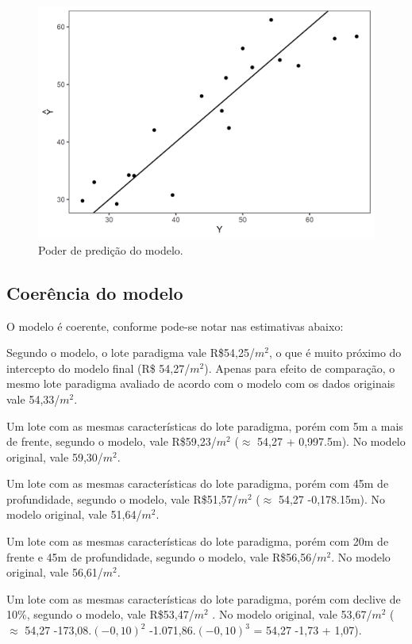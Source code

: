 \documentclass[a4paper, 12pt]{article}
\begin{document}
\begin{figure}[H]

{\centering \includegraphics[width=0.7\linewidth]{images/pplot-1} 

}

\caption{Poder de predição do modelo.}\label{fig:pplot}
\end{figure}

\hypertarget{coerencia-do-modelo}{%
\subsection{Coerência do modelo}\label{coerencia-do-modelo}}

O modelo é coerente, conforme pode-se notar nas estimativas abaixo:

Segundo o modelo, o lote paradigma vale R\$54,25/\(m^2\), o que é muito
próximo do intercepto do modelo final (R\$ 54,27/\(m^2\)). Apenas para
efeito de comparação, o mesmo lote paradigma avaliado de acordo com o
modelo com os dados originais vale 54,33/\(m^2\).

Um lote com as mesmas características do lote paradigma, porém com 5m a
mais de frente, segundo o modelo, vale R\$59,23/\(m^2\) (\(\approx\)
54,27 + 0,997.5m). No modelo original, vale 59,30/\(m^2\).

Um lote com as mesmas características do lote paradigma, porém com 45m
de profundidade, segundo o modelo, vale R\$51,57/\(m^2\) (\(\approx\)
54,27 -0,178.15m). No modelo original, vale 51,64/\(m^2\).

Um lote com as mesmas características do lote paradigma, porém com 20m
de frente e 45m de profundidade, segundo o modelo, vale
R\$56,56/\(m^2\). No modelo original, vale 56,61/\(m^2\).

Um lote com as mesmas características do lote paradigma, porém com
declive de 10\%, segundo o modelo, vale R\$53,47/\(m^2\) . No modelo
original, vale 53,67/\(m^2\) (\(\approx\) 54,27 -173,08.\((-0,10)^2\)
-1.071,86.\((-0,10)^3\) = 54,27 -1,73 + 1,07).
\end{document}
